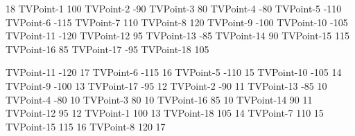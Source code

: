 
\begin{myverbbox}[\small]{\vinput}
    18
    TVPoint-1 100
    TVPoint-2 -90
    TVPoint-3 80
    TVPoint-4 -80
    TVPoint-5 -110
    TVPoint-6 -115
    TVPoint-7 110
    TVPoint-8 120
    TVPoint-9 -100
    TVPoint-10 -105
    TVPoint-11 -120
    TVPoint-12 95
    TVPoint-13 -85
    TVPoint-14 90
    TVPoint-15 115
    TVPoint-16 85
    TVPoint-17 -95
    TVPoint-18 105
    \end{myverbbox}
\begin{myverbbox}[\small]{\voutput}
    TVPoint-11 -120 17
    TVPoint-6 -115 16
    TVPoint-5 -110 15
    TVPoint-10 -105 14
    TVPoint-9 -100 13
    TVPoint-17 -95 12
    TVPoint-2 -90 11
    TVPoint-13 -85 10
    TVPoint-4 -80 10
    TVPoint-3 80 10
    TVPoint-16 85 10
    TVPoint-14 90 11
    TVPoint-12 95 12
    TVPoint-1 100 13
    TVPoint-18 105 14
    TVPoint-7 110 15
    TVPoint-15 115 16
    TVPoint-8 120 17
\end{myverbbox}

